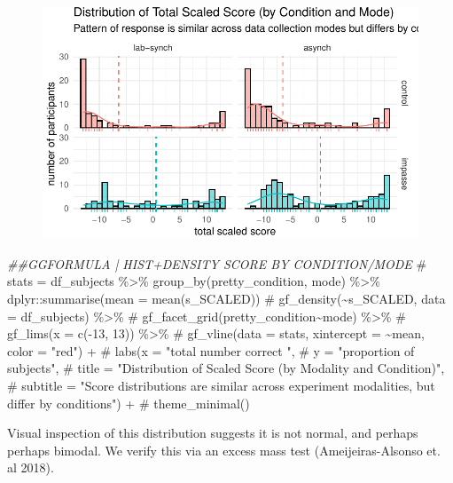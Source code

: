 \documentclass[
  letterpaper,
  DIV=11,
  numbers=noendperiod]{scrreprt}
\newenvironment{Shaded}{\begin{snugshade}}{\end{snugshade}}
\newcommand{\CommentTok}[1]{\textcolor[rgb]{0.37,0.37,0.37}{#1}}
\newcommand{\DocumentationTok}[1]{\textcolor[rgb]{0.37,0.37,0.37}{\textit{#1}}}
\newcommand{\FunctionTok}[1]{\textcolor[rgb]{0.28,0.35,0.67}{#1}}
\newcommand{\NormalTok}[1]{\textcolor[rgb]{0.00,0.23,0.31}{#1}}
\newcommand{\SpecialCharTok}[1]{\textcolor[rgb]{0.37,0.37,0.37}{#1}}
\begin{document}
\begin{figure}[H]

{\centering \includegraphics{analysis/SGC3A/3_sgc3A_description_files/figure-pdf/VIS-SUBJ-SCALED-2.pdf}

}

\end{figure}

\begin{Shaded}
\begin{Highlighting}[]
\DocumentationTok{\#\#GGFORMULA | HIST+DENSITY SCORE BY CONDITION/MODE}
\CommentTok{\# stats = df\_subjects \%\textgreater{}\% group\_by(pretty\_condition, mode) \%\textgreater{}\% dplyr::summarise(mean = mean(s\_SCALED))}
\CommentTok{\# gf\_density(\textasciitilde{}s\_SCALED, data = df\_subjects) \%\textgreater{}\%}
\CommentTok{\#   gf\_facet\_grid(pretty\_condition\textasciitilde{}mode) \%\textgreater{}\%}
\CommentTok{\#   gf\_lims(x = c({-}13, 13)) \%\textgreater{}\%}
\CommentTok{\#   gf\_vline(data = stats, xintercept = \textasciitilde{}mean, color = "red") +}
\CommentTok{\#   labs(x = "total number correct ",}
\CommentTok{\#        y = "proportion of subjects",}
\CommentTok{\#        title = "Distribution of Scaled Score (by Modality and Condition)",}
\CommentTok{\#        subtitle = "Score distributions are similar across experiment modalities, but differ by conditions") +}
\CommentTok{\#   theme\_minimal()}
\end{Highlighting}
\end{Shaded}

Visual inspection of this distribution suggests it is not normal, and
perhaps perhaps bimodal. We verify this via an excess mass test
(Ameijeiras-Alsonso et. al 2018).

\begin{Shaded}
\end{Shaded}
\end{document}

